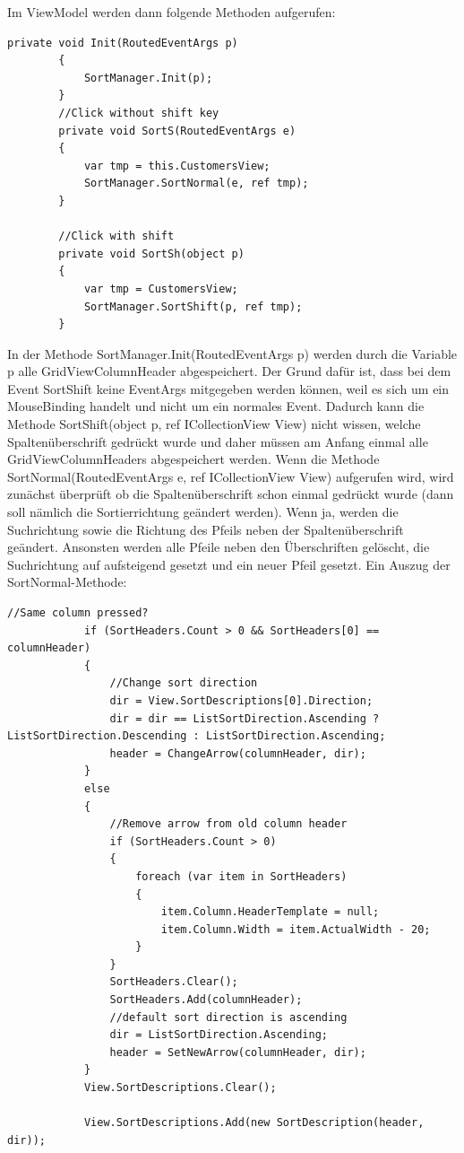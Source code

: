 Im ViewModel werden dann folgende Methoden aufgerufen:
\begin{lstlisting}
private void Init(RoutedEventArgs p)
        {
            SortManager.Init(p);
        }
        //Click without shift key
        private void SortS(RoutedEventArgs e)
        {
            var tmp = this.CustomersView;
            SortManager.SortNormal(e, ref tmp);
        }

        //Click with shift
        private void SortSh(object p)
        {
            var tmp = CustomersView;
            SortManager.SortShift(p, ref tmp);
        }
\end{lstlisting}
In der Methode SortManager.Init(RoutedEventArgs p) werden durch die Variable p alle GridViewColumnHeader abgespeichert. Der Grund dafür ist, dass bei dem Event SortShift keine EventArgs mitgegeben werden können, weil es sich um ein MouseBinding handelt und nicht um ein normales Event. Dadurch kann die Methode SortShift(object p, ref ICollectionView View) nicht wissen, welche Spaltenüberschrift gedrückt wurde und daher müssen am Anfang einmal alle GridViewColumnHeaders abgespeichert werden.
Wenn die Methode SortNormal(RoutedEventArgs e, ref ICollectionView View) aufgerufen wird, wird zunächst überprüft ob die Spaltenüberschrift schon einmal gedrückt wurde (dann soll nämlich die Sortierrichtung geändert werden). Wenn ja, werden die Suchrichtung sowie die Richtung des Pfeils neben der Spaltenüberschrift geändert. Ansonsten werden alle Pfeile neben den Überschriften gelöscht, die Suchrichtung auf aufsteigend gesetzt und ein neuer Pfeil gesetzt. Ein Auszug der SortNormal-Methode:
\begin{lstlisting}
//Same column pressed?
            if (SortHeaders.Count > 0 && SortHeaders[0] == columnHeader)
            {
                //Change sort direction
                dir = View.SortDescriptions[0].Direction;
                dir = dir == ListSortDirection.Ascending ? ListSortDirection.Descending : ListSortDirection.Ascending;
                header = ChangeArrow(columnHeader, dir);
            }
            else
            {
                //Remove arrow from old column header
                if (SortHeaders.Count > 0)
                {
                    foreach (var item in SortHeaders)
                    {
                        item.Column.HeaderTemplate = null;
                        item.Column.Width = item.ActualWidth - 20;
                    }
                }
                SortHeaders.Clear();
                SortHeaders.Add(columnHeader);
                //default sort direction is ascending
                dir = ListSortDirection.Ascending;
                header = SetNewArrow(columnHeader, dir);
            }
            View.SortDescriptions.Clear();

            View.SortDescriptions.Add(new SortDescription(header, dir));
\end{lstlisting}
